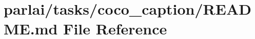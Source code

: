 \hypertarget{parlai_2tasks_2coco__caption_2README_8md}{}\section{parlai/tasks/coco\+\_\+caption/\+R\+E\+A\+D\+ME.md File Reference}
\label{parlai_2tasks_2coco__caption_2README_8md}
